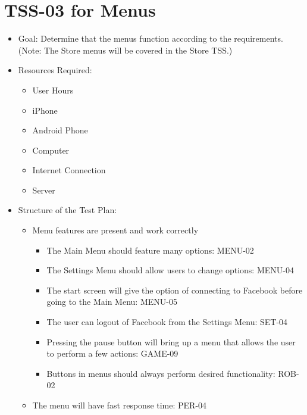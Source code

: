 \section{TSS-03 for Menus}
\begin{itemize}
\item Goal: Determine that the menus function according to the requirements.
(Note: The Store menus will be covered in the Store TSS.)
\item Resources Required: 

\begin{itemize}
\item User Hours 
\item iPhone 
\item Android Phone 
\item Computer 
\item Internet Connection 
\item Server
\end{itemize}
\item Structure of the Test Plan: 

\begin{itemize}
\item Menu features are present and work correctly 

\begin{itemize}
\item The Main Menu should feature many options: MENU-02
\item The Settings Menu should allow users to change options: MENU-04
\item The start screen will give the option of connecting to Facebook before
going to the Main Menu: MENU-05
\item The user can logout of Facebook from the Settings Menu: SET-04
\item Pressing the pause button will bring up a menu that allows the user
to perform a few actions: GAME-09
\item Buttons in menus should always perform desired functionality: ROB-02
\end{itemize}
\item The menu will have fast response time: PER-04
\end{itemize}
\end{itemize}

